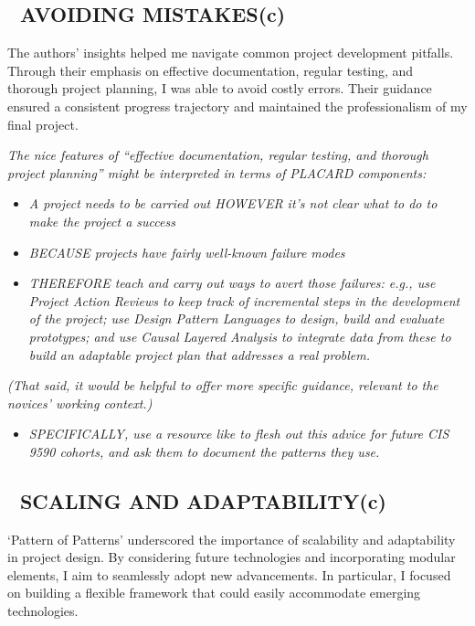 \documentclass[acmlarge,timestamp]{acmart}
\newcommand{\cognitive}{(c)}
\begin{document}
\subsection*{💎 AVOIDING MISTAKES{\hfill \cognitive}}
The authors' insights helped me navigate common project development
pitfalls.  Through their emphasis on effective documentation, regular
testing, and thorough project planning, I was able to avoid costly
errors.  Their guidance ensured a consistent progress trajectory and
maintained the professionalism of my final project.

\smallskip
\noindent \emph{The nice features of “effective documentation, regular testing, and thorough project planning” might be interpreted in terms of PLACARD components:}
\begin{itemize}
  \item \emph{A project needs to be carried out HOWEVER it’s not clear what to do to make the project a success}
  \item \emph{BECAUSE projects have fairly well-known failure modes}
  \item \emph{THEREFORE teach and carry out ways to avert those
  failures: e.g., use Project Action Reviews to keep track of
  incremental steps in the development of the project; use Design
  Pattern Languages to design, build and evaluate prototypes; and use
  Causal Layered Analysis to integrate data from these to build an
  adaptable project plan that addresses a real problem.}
\end{itemize}
\emph{(That said, it would be helpful to offer more specific guidance, relevant to the novices’ working context.)}
\begin{itemize}
\item \emph{SPECIFICALLY, use a resource like
\citet{hoover2009apprenticeship} to flesh out this advice for future
CIS 9590 cohorts, and ask them to document the patterns they use.}
\end{itemize}

\subsection*{💎 SCALING AND ADAPTABILITY{\hfill \cognitive}}
‘Pattern of Patterns’ underscored the importance of scalability and
adaptability in project design.  By considering future technologies
and incorporating modular elements, I aim to seamlessly adopt new
advancements.  In particular, I focused on building a flexible
framework that could easily accommodate emerging technologies.
\end{document}
